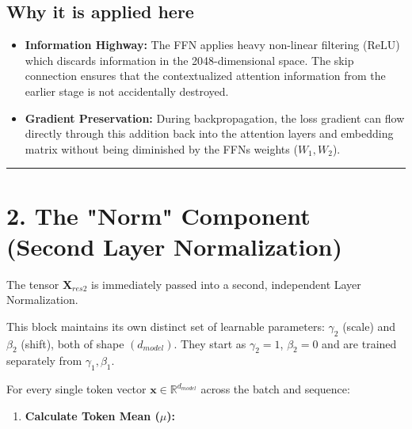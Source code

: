 \documentclass[11pt,a4paper,oneside]{report}
\providecommand{\tightlist}{\setlength{\itemsep}{0pt}\setlength{\parskip}{0pt}}
\begin{document}
\begin{center}\end{center}

\subsection{Why it is applied here}\label{why-it-is-applied-here}

\begin{itemize}
\tightlist
\item
  \textbf{Information Highway:} The FFN applies heavy non-linear filtering (\(\text{ReLU}\)) which discards information in the 2048-dimensional space. The skip connection ensures that the contextualized attention information from the earlier stage is not accidentally destroyed.
\item
  \textbf{Gradient Preservation:} During backpropagation, the loss gradient can flow directly through this addition back into the attention layers and embedding matrix without being diminished by the FFN\textquotesingle s weights (\(W_1, W_2\)).
\end{itemize}

\begin{center}\rule{0.5\linewidth}{0.5pt}\end{center}

\section{2. The "Norm" Component (Second Layer Normalization)}\label{2-the-norm-component-second-layer-normalization}

The tensor \(\mathbf{X}_{res2}\) is immediately passed into a second, independent Layer Normalization.

This block maintains its own distinct set of learnable parameters: \(\gamma_2\) (scale) and \(\beta_2\) (shift), both of shape \((d_{model})\). They start as \(\gamma_2 = 1\), \(\beta_2 = 0\) and are trained separately from \(\gamma_1, \beta_1\).

For every single token vector \(\mathbf{x} \in \mathbb{R}^{d_{model}}\) across the batch and sequence:

\begin{enumerate}
\def\labelenumi{\arabic{enumi}.}
\tightlist
\item
  \textbf{Calculate Token Mean (\(\mu\)):}
\end{enumerate}
\end{document}
